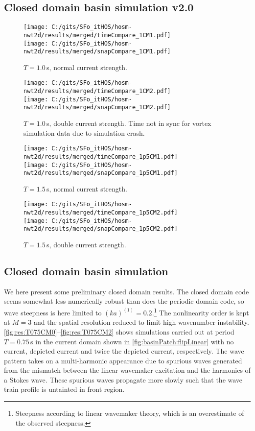 \documentclass[a4paper,12pt]{article}
\renewcommand{\_}[1]{_\mr{#1}}
\newcommand{\oo}[1]{^{(#1)}}
\begin{document}
\subsection{Closed domain basin simulation v2.0}

\begin{figure}[h!ptb]%
\centering
\texttt{[image: C:/gits/SFo\_gitHOS/hosm-nwt2d/results/merged/timeCompare\_T1CM1.pdf]}\\
\texttt{[image: C:/gits/SFo\_gitHOS/hosm-nwt2d/results/merged/snapCompare\_T1CM1.pdf]}%
\caption{$T=1.0$\,s, normal current strength.}%
\label{fig:res2:T1CM1}%
\end{figure}
\begin{figure}[h!ptb]%
\centering
\texttt{[image: C:/gits/SFo\_gitHOS/hosm-nwt2d/results/merged/timeCompare\_T1CM2.pdf]}\\
\texttt{[image: C:/gits/SFo\_gitHOS/hosm-nwt2d/results/merged/snapCompare\_T1CM2.pdf]}%
\caption{$T=1.0$\,s, double current strength. Time not in sync for vortex simulation data due to simulation crash.}%
\label{fig:res2:T1CM2}%
\end{figure}
\begin{figure}[h!ptb]%
\centering
\texttt{[image: C:/gits/SFo\_gitHOS/hosm-nwt2d/results/merged/timeCompare\_T1p5CM1.pdf]}\\
\texttt{[image: C:/gits/SFo\_gitHOS/hosm-nwt2d/results/merged/snapCompare\_T1p5CM1.pdf]}%
\caption{$T=1.5$\,s, normal current strength.}%
\label{fig:res2:T1p5CM1}%
\end{figure}
\begin{figure}[h!ptb]%
\centering
\texttt{[image: C:/gits/SFo\_gitHOS/hosm-nwt2d/results/merged/timeCompare\_T1p5CM2.pdf]}\\
\texttt{[image: C:/gits/SFo\_gitHOS/hosm-nwt2d/results/merged/snapCompare\_T1p5CM2.pdf]}%
\caption{$T=1.5$\,s, double current strength.}%
\label{fig:res2:T1p5CM2}%
\end{figure}

\subsection{Closed domain basin simulation}
We here present some preliminary closed domain results. 
The closed domain code seems somewhat less numerically robust than does the periodic domain code, so wave steepness is here limited to $(ka)\oo1=0.2$.\footnote{Steepness according to linear wavemaker theory, which is an overestimate of the observed steepness.}
The nonlinearity order is kept at $M=3$ and the spatial resolution reduced to limit high-wavenumber instability.
\autoref{fig:res:T075CM0}--\ref{fig:res:T075CM2} shows simulations carried out at period $T=0.75$\,s in the current domain shown in \autoref{fig:basinPatch:flipLinear} with no current, depicted current and twice the depicted current, respectively. 
The wave pattern takes on a multi-harmonic appearance due to spurious waves generated from the mismatch between the linear wavemaker excitation and the harmonics of a Stokes wave. 
These spurious waves propagate more slowly such that the wave train profile is untainted in front region.
\end{document}
